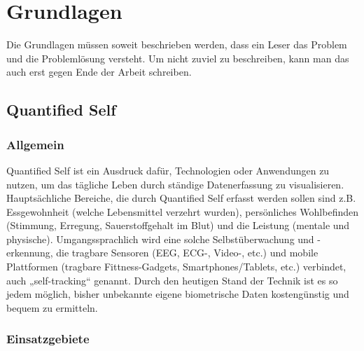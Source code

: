 
\chapter{Grundlagen}
\label{ch:Grundlagen}
Die Grundlagen müssen soweit beschrieben werden, dass ein Leser das Problem und die Problemlösung versteht.
Um nicht zuviel zu beschreiben, kann man das auch erst gegen Ende der Arbeit schreiben.


\section{Quantified Self}
\label{ch:Grundlagen:sec:QuantifiedSelf}

\subsection{Allgemein}
\label{ch:Grundlagen:sec:QuantifiedSelf:subsec:Allgemein}

Quantified Self ist ein Ausdruck dafür, Technologien oder Anwendungen zu nutzen, um das tägliche Leben durch ständige Datenerfassung zu visualisieren.
Hauptsächliche Bereiche, die durch Quantified Self erfasst werden sollen sind z.B. Essgewohnheit (welche Lebensmittel verzehrt wurden), persönliches Wohlbefinden (Stimmung, Erregung, Sauerstoffgehalt im Blut) und die Leistung (mentale und physische). 
Umgangssprachlich wird eine solche Selbstüberwachung und -erkennung, die tragbare Sensoren (EEG, ECG-, Video-, etc.) und mobile Plattformen (tragbare Fittness-Gadgets, Smartphones/Tablets, etc.) verbindet, auch „self-tracking“ genannt. 
Durch den heutigen Stand der Technik ist es so jedem möglich, bisher unbekannte eigene biometrische Daten kostengünstig und bequem zu ermitteln.

\subsection{Einsatzgebiete}
\label{ch:Grundlagen:sec:QuantifiedSelf:subsec:Einsatzgebiete}

